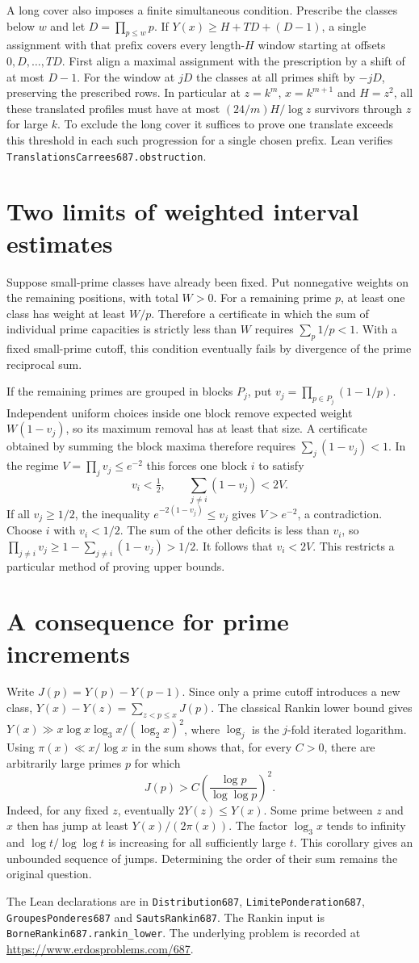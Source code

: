 \documentclass[11pt]{article}
\begin{document}
A long cover also imposes a finite simultaneous condition. Prescribe
the classes below $w$ and let $D=\prod_{p\le w}p$. If
$Y(x)\ge H+TD+(D-1)$, a single assignment with that prefix covers
every length-$H$ window starting at offsets $0,D,\ldots,TD$.
First align a maximal assignment with the prescription by a shift of
at most $D-1$. For the window at $jD$ the classes at all primes shift
by $-jD$, preserving the prescribed rows. In particular
at $z=k^m$, $x=k^{m+1}$ and $H=z^2$, all these translated profiles
must have at most $(24/m)H/\log z$ survivors through $z$ for large $k$.
To exclude the long cover it suffices to prove one translate exceeds
this threshold in each such progression for a single chosen prefix.
Lean verifies \texttt{TranslationsCarrees687.obstruction}.

\section*{Two limits of weighted interval estimates}
Suppose small-prime classes have already been fixed. Put nonnegative
weights on the remaining positions, with total $W>0$. For a remaining
prime $p$, at least one class has weight at least $W/p$. Therefore a
certificate in which the sum of individual prime capacities is strictly
less than $W$ requires $\sum_p1/p<1$. With a fixed small-prime cutoff,
this condition eventually fails by divergence of the prime reciprocal sum.

If the remaining primes are grouped in blocks $P_j$, put
$v_j=\prod_{p\in P_j}(1-1/p)$. Independent uniform choices inside one
block remove expected weight $W(1-v_j)$, so its maximum removal has
at least that size. A certificate obtained by summing the block maxima
therefore requires $\sum_j(1-v_j)<1$. In the regime
$V=\prod_jv_j\le e^{-2}$ this forces one block $i$ to satisfy
\[
 v_i<\tfrac12,\qquad \sum_{j\ne i}(1-v_j)<2V.
\]
If all $v_j\ge1/2$, the inequality $e^{-2(1-v_j)}\le v_j$ gives
$V>e^{-2}$, a contradiction. Choose $i$ with $v_i<1/2$. The sum of
the other deficits is less than $v_i$, so
$\prod_{j\ne i}v_j\ge1-\sum_{j\ne i}(1-v_j)>1/2$. It follows that
$v_i<2V$. This restricts a particular method of proving upper bounds.

\section*{A consequence for prime increments}
Write $J(p)=Y(p)-Y(p-1)$. Since only a prime cutoff introduces a new
class, $Y(x)-Y(z)=\sum_{z<p\le x}J(p)$. The classical Rankin lower
bound gives $Y(x)\gg x\log x\log_3x/(\log_2x)^2$, where
$\log_j$ is the $j$-fold iterated logarithm. Using
$\pi(x)\ll x/\log x$ in the sum shows that, for every $C>0$, there
are arbitrarily large primes $p$ for which
\[
 J(p)>C\left(\frac{\log p}{\log\log p}\right)^2.
\]
Indeed, for any fixed $z$, eventually $2Y(z)\le Y(x)$. Some prime
between $z$ and $x$ then has jump at least $Y(x)/(2\pi(x))$.
The factor $\log_3x$ tends to infinity and $\log t/\log\log t$
is increasing for all sufficiently large $t$. This corollary gives an
unbounded sequence of jumps. Determining the order of their sum remains
the original question.

The Lean declarations are in \texttt{Distribution687}, \texttt{LimitePonderation687},
\texttt{GroupesPonderes687} and \texttt{SautsRankin687}. The Rankin input is
\texttt{BorneRankin687.rankin\_lower}. The underlying problem is recorded
at \url{https://www.erdosproblems.com/687}.
\end{document}
